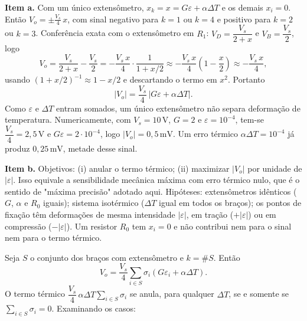 \documentclass{article}%
\begin{document}
\textbf{Item a.} Com um único extensômetro, $x_k=x=G\varepsilon+\alpha\Delta T$ e os demais $x_i=0$. Então $V_o=\pm\frac{V_s}{4}\,x$, com sinal negativo para $k=1$ ou $k=4$ e positivo para $k=2$ ou $k=3$. Conferência exata com o extensômetro em $R_1$: $V_D=\dfrac{V_s}{2+x}$ e $V_B=\dfrac{V_s}{2}$, logo
\[
V_o=\frac{V_s}{2+x}-\frac{V_s}{2}=-\frac{V_s\,x}{4}\cdot\frac{1}{1+x/2}\approx-\frac{V_s\,x}{4}\left(1-\frac{x}{2}\right)\approx-\frac{V_s\,x}{4},
\]
usando $(1+x/2)^{-1}\approx 1-x/2$ e descartando o termo em $x^2$. Portanto
\[
|V_o|=\frac{V_s}{4}\,\bigl|G\varepsilon+\alpha\Delta T\bigr|.
\]
Como $\varepsilon$ e $\Delta T$ entram somados, um único extensômetro não separa deformação de temperatura. Numericamente, com $V_s=10\,\mathrm{V}$, $G=2$ e $\varepsilon=10^{-4}$, tem-se $\dfrac{V_s}{4}=2{,}5\,\mathrm{V}$ e $G\varepsilon=2\cdot 10^{-4}$, logo $|V_o|=0{,}5\,\mathrm{mV}$. Um erro térmico $\alpha\Delta T=10^{-4}$ já produz $0{,}25\,\mathrm{mV}$, metade desse sinal.

\textbf{Item b.} Objetivos: (i) anular o termo térmico; (ii) maximizar $|V_o|$ por unidade de $|\varepsilon|$. Isso equivale a sensibilidade mecânica máxima com erro térmico nulo, que é o sentido de "máxima precisão" adotado aqui. Hipóteses: extensômetros idênticos ($G$, $\alpha$ e $R_0$ iguais); sistema isotérmico ($\Delta T$ igual em todos os braços); os pontos de fixação têm deformações de mesma intensidade $|\varepsilon|$, em tração ($+|\varepsilon|$) ou em compressão ($-|\varepsilon|$). Um resistor $R_0$ tem $x_i=0$ e não contribui nem para o sinal nem para o termo térmico.

Seja $S$ o conjunto dos braços com extensômetro e $k=\#S$. Então
\[
V_o=\frac{V_s}{4}\sum_{i\in S}\sigma_i\left(G\varepsilon_i+\alpha\Delta T\right).
\]
O termo térmico $\dfrac{V_s}{4}\,\alpha\Delta T\sum_{i\in S}\sigma_i$ se anula, para qualquer $\Delta T$, se e somente se $\sum_{i\in S}\sigma_i=0$. Examinando os casos:
\end{document}
